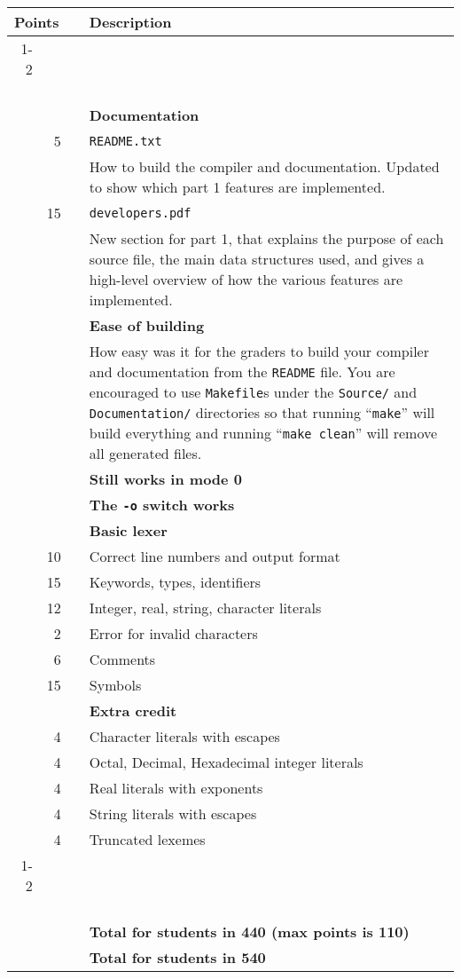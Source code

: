 \documentclass{article}
\makeatletter
\newcommand{\gradeline}{ \cline{1-2} \cline{4-4} ~\\[-1.5ex] }
\newenvironment{gradetable}{\begin{longtable}{@{}rrcp{5in}} \multicolumn{2}{l}{\bf Points} & & {\bf Description}\\ \gradeline}{\end{longtable}}
\newcommand{\mainitem}[2]{\pagebreak[2] {\bf #1} &&& {\bf #2}}
\newcommand{\mainpara}[1]{~ &&& {#1} }
\newcommand{\inneritem}[2]{~ & #1 && #2}
\newcommand{\innerpara}[1]{~ & ~ && #1}
\makeatother
\begin{document}
\noindent
\begin{gradetable}
  \mainitem{20}{Documentation}
  \\[1mm]
  \inneritem{5}{\tt README.txt}
  \\[1mm]
  \innerpara{%
    How to build the compiler and documentation.
    Updated to show which part 1 features are implemented.
  }
  \\[1mm]
  \inneritem{15}{\tt developers.pdf}
  \\[1mm]
  \innerpara{%
    New section for part 1, that explains
    the purpose of each source file,
    the main data structures used,
    and gives a high-level overview of how the various
    features are implemented.
  }
  \\[4mm]

  \mainitem{10}{Ease of building}
  \\[1mm]
  \mainpara{%
    How easy was it for the graders to build your compiler and
    documentation from the {\tt README} file.
		You are encouraged to use {\tt Makefile}s under the
		{\tt Source/} and {\tt Documentation/}
		directories so that running ``{\tt make}''
		will build everything and running ``{\tt make clean}''
		will remove all generated files.
  }
  \\[4mm]

  \mainitem{5}{Still works in mode 0}
  \\[4mm]

  \mainitem{5}{The {\tt -o} switch works}
  \\[4mm]

  \mainitem{60}{Basic lexer}
  \\
  \inneritem{10}{Correct line numbers and output format}
  \\
	\inneritem{15}{Keywords, types, identifiers}
  \\
  \inneritem{12}{Integer, real, string, character literals}
  \\
  \inneritem{2}{Error for invalid characters}
  \\
  \inneritem{6}{Comments}
  \\
  \inneritem{15}{Symbols}
  \\[4mm]

	\mainitem{20}{Extra credit}
	\\
	\inneritem{4}{Character literals with escapes}
	\\
	\inneritem{4}{Octal, Decimal, Hexadecimal integer literals}
	\\
	\inneritem{4}{Real literals with exponents}
	\\
	\inneritem{4}{String literals with escapes}
	\\
	\inneritem{4}{Truncated lexemes}
	\\

  \gradeline
  \mainitem{100}{Total for students in 440 (max points is 110)}
  \\
  \mainitem{112}{Total for students in 540}
\end{gradetable}
\end{document}
